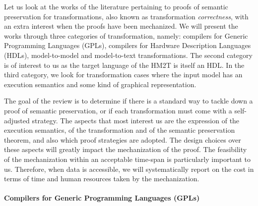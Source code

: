 \documentclass[pdflatex,sn-mathphys]{sn-jnl}%
\theoremstyle{thmstyleone}%
\theoremstyle{thmstyletwo}%
\theoremstyle{thmstylethree}%
\begin{document}

Let us look at the works of the literature pertaining to proofs of
semantic preservation for transformations, also known as
transformation \textit{correctness}, with an extra interest when the
proofs have been mechanized. We will present the works through three
categories of transformation, namely: compilers for Generic
Programming Languages (GPLs), compilers for Hardware Description
Languages (HDLs), model-to-model and model-to-text
transformations. The second category is of interest to us as the
target language of the HM2T is itself an HDL. In the third category,
we look for transformation cases where the input model has an
execution semantics and some kind of graphical representation.


The goal of the review is to determine if there is a standard way to
tackle down a proof of semantic preservation, or if each
transformation must come with a self-adjusted strategy. The aspects
that most interest us are the expression of the execution semantics,
of the transformation and of the semantic preservation theorem, and
also which proof strategies are adopted. The design choices over these
aspects will greatly impact the mechanization of the proof. The
feasibility of the mechanization within an acceptable time-span is
particularly important to us. Therefore, when data is accessible, we
will systematically report on the cost in terms of time and human
resources taken by the mechanization.

\paragraph{Compilers for Generic Programming Languages (GPLs)}
\end{document}
